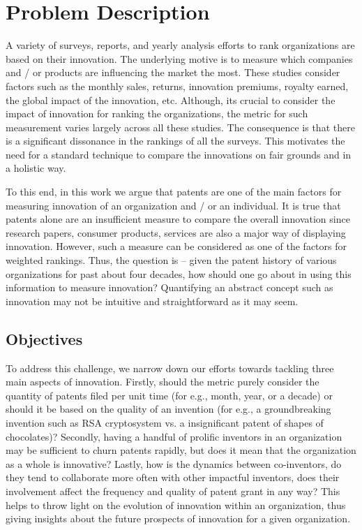 \section{Problem Description}
\label{sec:prob}

A variety of surveys, reports, and yearly analysis efforts to rank
organizations are based on their innovation. The underlying motive is to measure
which companies and / or products are influencing the market the most.  These
studies consider factors such as the monthly sales, returns, innovation
premiums, royalty earned, the global impact of the innovation, etc. Although,
its crucial to consider the impact of innovation for ranking the
organizations, the metric for such measurement  varies largely across all these 
studies. The consequence is that there is a significant dissonance in the
rankings of all the surveys.  This motivates the need for a standard technique
to compare the innovations on fair grounds and in a holistic way. 

To this end, in this work we argue that patents are one of the main factors for
measuring innovation of an organization and / or an individual. It is true
that patents alone are an insufficient measure to compare the overall
innovation since research papers, consumer products, services are also a major
way of displaying innovation. However, such a measure can be considered as one
of the factors for weighted rankings. Thus, the question is -- given the patent history of
various organizations for past about four decades,  how should one go about in
using this information to measure innovation? Quantifying an abstract
concept such as innovation may not be intuitive and straightforward as it may seem.  

\subsection{Objectives}

To address this challenge, we narrow down our efforts towards tackling
three main  aspects of innovation. Firstly, should the metric purely consider
the quantity of patents filed per unit time (for e.g., month, year, or a
decade) or should it be based on the quality of an invention (for e.g., a
groundbreaking invention such as RSA cryptosystem vs. a insignificant patent
of shapes of chocolates)? Secondly, having a handful of prolific inventors in
an organization may be sufficient to churn patents rapidly, but does it mean
that the organization as a whole is innovative? Lastly, how is the dynamics
between co-inventors, do they tend to collaborate more often with other
impactful inventors, does their involvement affect the frequency and quality of patent grant in any
way? This helps to throw light on the evolution of innovation within an
organization, thus giving insights about the future prospects of innovation
for a given organization.

